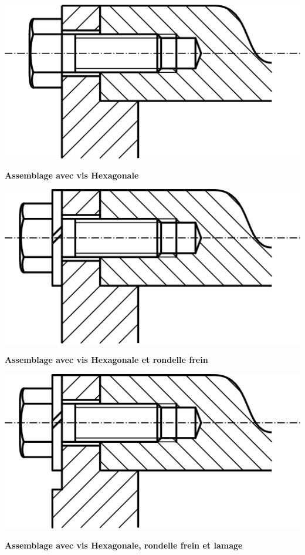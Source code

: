 \documentclass[11pt,oneside]{article}
\begin{document}
\noindent\begin{minipage}[c]{.3\linewidth}
\begin{center}
\includegraphics[width=.9\textwidth]{png/Fig30_2}

\textbf{Assemblage avec vis Hexagonale}
\end{center}
\end{minipage}\hfill
\begin{minipage}[c]{.3\linewidth}
\begin{center}
\includegraphics[width=.9\textwidth]{png/Fig30_3}

\textbf{Assemblage avec vis Hexagonale et rondelle frein}
\end{center}
\end{minipage}\hfill
\begin{minipage}[c]{.3\linewidth}
\begin{center}
\includegraphics[width=.9\textwidth]{png/Fig30_6}

\textbf{Assemblage avec vis Hexagonale, rondelle frein et lamage}
\end{center}
\end{minipage}
\end{document}

